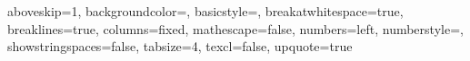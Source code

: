
\usepackage{lmodern}

\usepackage[english]{babel}

\usepackage[utf8]{inputenc} %
\usepackage[T1]{fontenc} %
\usepackage[table]{xcolor}

\usepackage{titlesec} %
\setcounter{tocdepth}{3} %
\setcounter{secnumdepth}{3} %
\setlength{\parindent}{0pt} %

\titleformat{\chapter}{\Huge\bf}{\thechapter}{20pt}{\Huge\bf}

\usepackage[hidelinks, linktoc=all]{hyperref}
\usepackage[nottoc]{tocbibind}  %
\usepackage{textcomp} %
\usepackage{url} %
\usepackage{listings} %

\lstset
{
  aboveskip={1\baselineskip}, %
  backgroundcolor=\color{shadecolor}, %
  basicstyle={\ttfamily\footnotesize}, %
  breakatwhitespace=true, %
  breaklines=true, %
  columns=fixed, %
  mathescape=false, %
  numbers=left, %
  numberstyle=\tiny\color{gray}, %
  showstringspaces=false, %
  tabsize=4, %
  texcl=false, %
  upquote=true %
}

\usepackage{chngcntr}

\usepackage{tikz} %
\usepackage{pgfplots} %

